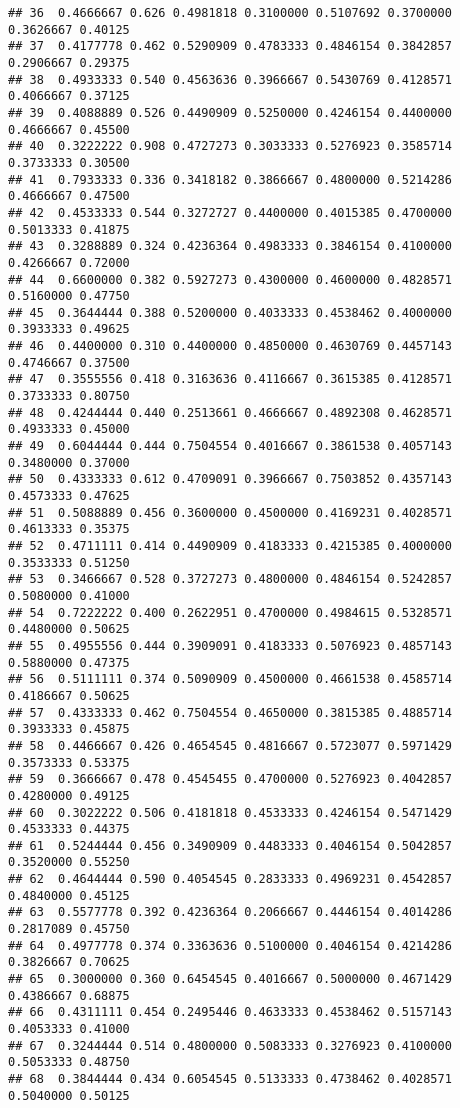 \documentclass[
]{article}
\begin{document}
\begin{verbatim}
## 36  0.4666667 0.626 0.4981818 0.3100000 0.5107692 0.3700000 0.3626667 0.40125
## 37  0.4177778 0.462 0.5290909 0.4783333 0.4846154 0.3842857 0.2906667 0.29375
## 38  0.4933333 0.540 0.4563636 0.3966667 0.5430769 0.4128571 0.4066667 0.37125
## 39  0.4088889 0.526 0.4490909 0.5250000 0.4246154 0.4400000 0.4666667 0.45500
## 40  0.3222222 0.908 0.4727273 0.3033333 0.5276923 0.3585714 0.3733333 0.30500
## 41  0.7933333 0.336 0.3418182 0.3866667 0.4800000 0.5214286 0.4666667 0.47500
## 42  0.4533333 0.544 0.3272727 0.4400000 0.4015385 0.4700000 0.5013333 0.41875
## 43  0.3288889 0.324 0.4236364 0.4983333 0.3846154 0.4100000 0.4266667 0.72000
## 44  0.6600000 0.382 0.5927273 0.4300000 0.4600000 0.4828571 0.5160000 0.47750
## 45  0.3644444 0.388 0.5200000 0.4033333 0.4538462 0.4000000 0.3933333 0.49625
## 46  0.4400000 0.310 0.4400000 0.4850000 0.4630769 0.4457143 0.4746667 0.37500
## 47  0.3555556 0.418 0.3163636 0.4116667 0.3615385 0.4128571 0.3733333 0.80750
## 48  0.4244444 0.440 0.2513661 0.4666667 0.4892308 0.4628571 0.4933333 0.45000
## 49  0.6044444 0.444 0.7504554 0.4016667 0.3861538 0.4057143 0.3480000 0.37000
## 50  0.4333333 0.612 0.4709091 0.3966667 0.7503852 0.4357143 0.4573333 0.47625
## 51  0.5088889 0.456 0.3600000 0.4500000 0.4169231 0.4028571 0.4613333 0.35375
## 52  0.4711111 0.414 0.4490909 0.4183333 0.4215385 0.4000000 0.3533333 0.51250
## 53  0.3466667 0.528 0.3727273 0.4800000 0.4846154 0.5242857 0.5080000 0.41000
## 54  0.7222222 0.400 0.2622951 0.4700000 0.4984615 0.5328571 0.4480000 0.50625
## 55  0.4955556 0.444 0.3909091 0.4183333 0.5076923 0.4857143 0.5880000 0.47375
## 56  0.5111111 0.374 0.5090909 0.4500000 0.4661538 0.4585714 0.4186667 0.50625
## 57  0.4333333 0.462 0.7504554 0.4650000 0.3815385 0.4885714 0.3933333 0.45875
## 58  0.4466667 0.426 0.4654545 0.4816667 0.5723077 0.5971429 0.3573333 0.53375
## 59  0.3666667 0.478 0.4545455 0.4700000 0.5276923 0.4042857 0.4280000 0.49125
## 60  0.3022222 0.506 0.4181818 0.4533333 0.4246154 0.5471429 0.4533333 0.44375
## 61  0.5244444 0.456 0.3490909 0.4483333 0.4046154 0.5042857 0.3520000 0.55250
## 62  0.4644444 0.590 0.4054545 0.2833333 0.4969231 0.4542857 0.4840000 0.45125
## 63  0.5577778 0.392 0.4236364 0.2066667 0.4446154 0.4014286 0.2817089 0.45750
## 64  0.4977778 0.374 0.3363636 0.5100000 0.4046154 0.4214286 0.3826667 0.70625
## 65  0.3000000 0.360 0.6454545 0.4016667 0.5000000 0.4671429 0.4386667 0.68875
## 66  0.4311111 0.454 0.2495446 0.4633333 0.4538462 0.5157143 0.4053333 0.41000
## 67  0.3244444 0.514 0.4800000 0.5083333 0.3276923 0.4100000 0.5053333 0.48750
## 68  0.3844444 0.434 0.6054545 0.5133333 0.4738462 0.4028571 0.5040000 0.50125

\end{verbatim}
\end{document}
